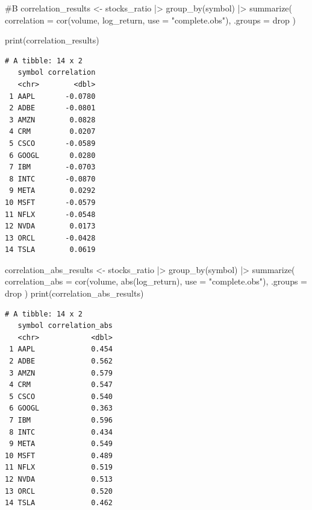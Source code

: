 \documentclass[
  letterpaper,
  DIV=11,
  numbers=noendperiod]{scrartcl}
\newenvironment{Shaded}{\begin{snugshade}}{\end{snugshade}}
\newcommand{\AttributeTok}[1]{\textcolor[rgb]{0.40,0.45,0.13}{#1}}
\newcommand{\CommentTok}[1]{\textcolor[rgb]{0.37,0.37,0.37}{#1}}
\newcommand{\FunctionTok}[1]{\textcolor[rgb]{0.28,0.35,0.67}{#1}}
\newcommand{\NormalTok}[1]{\textcolor[rgb]{0.00,0.23,0.31}{#1}}
\newcommand{\OtherTok}[1]{\textcolor[rgb]{0.00,0.23,0.31}{#1}}
\newcommand{\SpecialCharTok}[1]{\textcolor[rgb]{0.37,0.37,0.37}{#1}}
\newcommand{\StringTok}[1]{\textcolor[rgb]{0.13,0.47,0.30}{#1}}
\begin{document}
\begin{itemize}
\begin{Shaded}
\begin{Highlighting}[]
\CommentTok{\#B}
\NormalTok{correlation\_results }\OtherTok{\textless{}{-}}\NormalTok{ stocks\_ratio }\SpecialCharTok{|\textgreater{}}
  \FunctionTok{group\_by}\NormalTok{(symbol) }\SpecialCharTok{|\textgreater{}}
  \FunctionTok{summarize}\NormalTok{(}
    \AttributeTok{correlation =} \FunctionTok{cor}\NormalTok{(volume, log\_return, }\AttributeTok{use =} \StringTok{"complete.obs"}\NormalTok{),}
    \AttributeTok{.groups =} \StringTok{\textquotesingle{}drop\textquotesingle{}}
\NormalTok{  )}

\FunctionTok{print}\NormalTok{(correlation\_results)}
\end{Highlighting}
\end{Shaded}

\begin{verbatim}
# A tibble: 14 x 2
   symbol correlation
   <chr>        <dbl>
 1 AAPL       -0.0780
 2 ADBE       -0.0801
 3 AMZN        0.0828
 4 CRM         0.0207
 5 CSCO       -0.0589
 6 GOOGL       0.0280
 7 IBM        -0.0703
 8 INTC       -0.0870
 9 META        0.0292
10 MSFT       -0.0579
11 NFLX       -0.0548
12 NVDA        0.0173
13 ORCL       -0.0428
14 TSLA        0.0619
\end{verbatim}

\begin{Shaded}
\begin{Highlighting}[]
\NormalTok{correlation\_abs\_results }\OtherTok{\textless{}{-}}\NormalTok{ stocks\_ratio }\SpecialCharTok{|\textgreater{}}
  \FunctionTok{group\_by}\NormalTok{(symbol) }\SpecialCharTok{|\textgreater{}}
  \FunctionTok{summarize}\NormalTok{(}
    \AttributeTok{correlation\_abs =} \FunctionTok{cor}\NormalTok{(volume, }\FunctionTok{abs}\NormalTok{(log\_return), }\AttributeTok{use =} \StringTok{"complete.obs"}\NormalTok{),}
    \AttributeTok{.groups =} \StringTok{\textquotesingle{}drop\textquotesingle{}}
\NormalTok{  )}
\FunctionTok{print}\NormalTok{(correlation\_abs\_results)}
\end{Highlighting}
\end{Shaded}

\begin{verbatim}
# A tibble: 14 x 2
   symbol correlation_abs
   <chr>            <dbl>
 1 AAPL             0.454
 2 ADBE             0.562
 3 AMZN             0.579
 4 CRM              0.547
 5 CSCO             0.540
 6 GOOGL            0.363
 7 IBM              0.596
 8 INTC             0.434
 9 META             0.549
10 MSFT             0.489
11 NFLX             0.519
12 NVDA             0.513
13 ORCL             0.520
14 TSLA             0.462
\end{verbatim}


\end{itemize}
\end{document}
